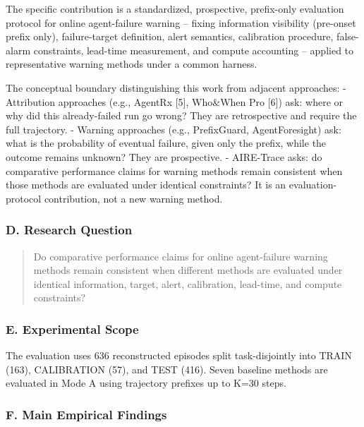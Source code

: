 \documentclass[
]{article}
\begin{document}
The specific contribution is a standardized, prospective, prefix-only
evaluation protocol for online agent-failure warning -- fixing
information visibility (pre-onset prefix only), failure-target
definition, alert semantics, calibration procedure, false-alarm
constraints, lead-time measurement, and compute accounting -- applied to
representative warning methods under a common harness.

The conceptual boundary distinguishing this work from adjacent
approaches: - Attribution approaches (e.g., AgentRx {[}5{]}, Who\&When
Pro {[}6{]}) ask: where or why did this already-failed run go wrong?
They are retrospective and require the full trajectory. - Warning
approaches (e.g., PrefixGuard, AgentForesight) ask: what is the
probability of eventual failure, given only the prefix, while the
outcome remains unknown? They are prospective. - AIRE-Trace asks: do
comparative performance claims for warning methods remain consistent
when those methods are evaluated under identical constraints? It is an
evaluation-protocol contribution, not a new warning method.

\subsubsection{D. Research Question}\label{d.-research-question}

\begin{quote}
Do comparative performance claims for online agent-failure warning
methods remain consistent when different methods are evaluated under
identical information, target, alert, calibration, lead-time, and
compute constraints?
\end{quote}

\subsubsection{E. Experimental Scope}\label{e.-experimental-scope}

The evaluation uses 636 reconstructed episodes split task-disjointly
into TRAIN (163), CALIBRATION (57), and TEST (416). Seven baseline
methods are evaluated in Mode A using trajectory prefixes up to K=30
steps.

\subsubsection{F. Main Empirical
Findings}\label{f.-main-empirical-findings}
\end{document}
